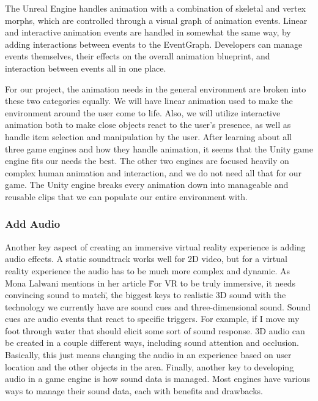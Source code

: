 \documentclass[10pt,journal,compsoc,onecolumn, draftclsnofoot]{IEEEtran}
\begin{document}
The Unreal Engine handles animation with a combination of skeletal and vertex morphs, which are controlled through a visual graph of animation events.
Linear and interactive animation events are handled in somewhat the same way, by adding interactions between events to the EventGraph.
Developers can manage events themselves, their effects on the overall animation blueprint, and interaction between events all in one place. \cite{unreal_animation}

For our project, the animation needs in the general environment are broken into these two categories equally. We will have linear animation used to make the environment around the user come to life. Also, we will utilize interactive animation both to make close objects react to the user's presence, as well as handle item selection and manipulation by the user. After learning about all three game engines and how they handle animation, it seems that the Unity game engine fits our needs the best. The other two engines are focused heavily on complex human animation and interaction, and we do not need all that for our game. The Unity engine breaks every animation down into manageable and reusable clips that we can populate our entire environment with.

\subsubsection{Add Audio}

Another key aspect of creating an immersive virtual reality experience is adding audio effects.
A static soundtrack works well for 2D video, but for a virtual reality experience the audio has to be much more complex and dynamic.
As Mona Lalwani mentions in her article \"For VR to be truly immersive, it needs convincing sound to match\", the biggest keys to realistic 3D sound with the technology we currently have are sound cues and three-dimensional sound. \cite{engadget_immersive_sound}
Sound cues are audio events that react to specific triggers.  For example, if I move my foot through water that should elicit some sort of sound response.
3D audio can be created in a couple different ways, including sound attention and occlusion.
Basically, this just means changing the audio in an experience based on user location and the other objects in the area.
Finally, another key to developing audio in a game engine is how sound data is managed.  Most engines have various ways to manage their sound data, each with benefits and drawbacks.
\end{document}
